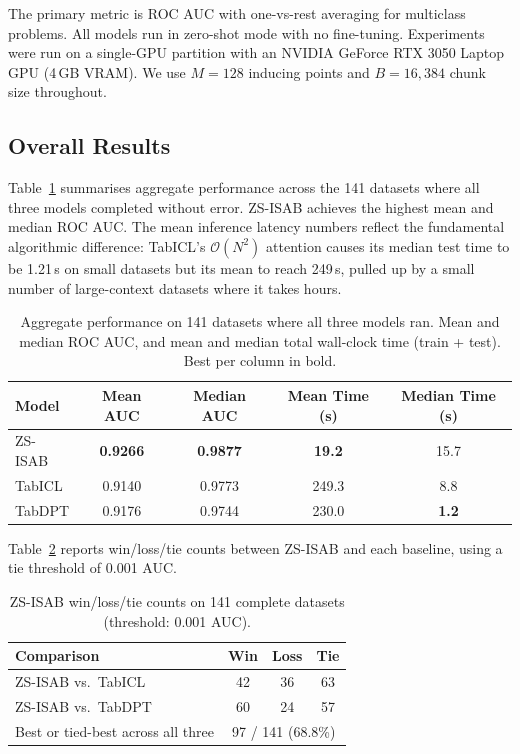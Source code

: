 \documentclass{article}
\begin{document}
The primary metric is ROC AUC with one-vs-rest averaging for multiclass problems. All models run in zero-shot mode with no fine-tuning. Experiments were run on a single-GPU partition with an NVIDIA GeForce RTX 3050 Laptop GPU (4\,GB VRAM). We use $M = 128$ inducing points and $B = 16{,}384$ chunk size throughout.

\subsection{Overall Results}

Table~\ref{tab:aggregate} summarises aggregate performance across the 141 datasets where all three models completed without error. ZS-ISAB achieves the highest mean and median ROC AUC. The mean inference latency numbers reflect the fundamental algorithmic difference: TabICL's $\mathcal{O}(N^2)$ attention causes its median test time to be 1.21\,s on small datasets but its mean to reach 249\,s, pulled up by a small number of large-context datasets where it takes hours.

\begin{table}[htbp]
\centering
\caption{Aggregate performance on 141 datasets where all three models ran. Mean and median ROC AUC, and mean and median total wall-clock time (train + test). Best per column in bold.}
\label{tab:aggregate}
\small
\begin{tabular}{@{}lcccc@{}}
\toprule
\textbf{Model} & \textbf{Mean AUC} & \textbf{Median AUC} & \textbf{Mean Time (s)} & \textbf{Median Time (s)} \\
\midrule
ZS-ISAB & \textbf{0.9266} & \textbf{0.9877} & \textbf{19.2} & 15.7 \\
TabICL  & 0.9140 & 0.9773 & 249.3 & 8.8 \\
TabDPT  & 0.9176 & 0.9744 & 230.0 & \textbf{1.2} \\
\bottomrule
\end{tabular}
\end{table}

Table~\ref{tab:wins} reports win/loss/tie counts between ZS-ISAB and each baseline, using a tie threshold of 0.001 AUC.

\begin{table}[htbp]
\centering
\caption{ZS-ISAB win/loss/tie counts on 141 complete datasets (threshold: 0.001 AUC).}
\label{tab:wins}
\small
\begin{tabular}{@{}lccc@{}}
\toprule
\textbf{Comparison} & \textbf{Win} & \textbf{Loss} & \textbf{Tie} \\
\midrule
ZS-ISAB vs.\ TabICL & 42 & 36 & 63 \\
ZS-ISAB vs.\ TabDPT & 60 & 24 & 57 \\
\midrule
Best or tied-best across all three & \multicolumn{3}{c}{97 / 141 (68.8\%)} \\
\bottomrule
\end{tabular}
\end{table}
\end{document}
